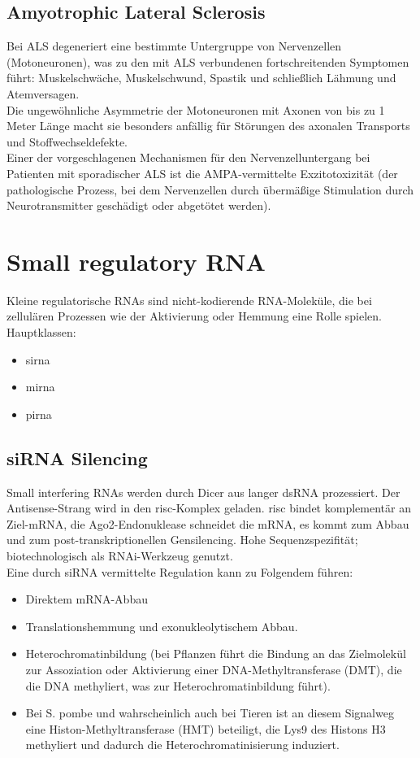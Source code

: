 \subsection{Amyotrophic Lateral Sclerosis}%
Bei ALS degeneriert eine bestimmte Untergruppe von Nervenzellen (Motoneuronen), was zu den mit ALS verbundenen fortschreitenden Symptomen führt: Muskelschwäche, Muskelschwund, Spastik und schließlich Lähmung und Atemversagen. \\
Die ungewöhnliche Asymmetrie der Motoneuronen mit Axonen von bis zu 1 Meter Länge macht sie besonders anfällig für Störungen des axonalen Transports und Stoffwechseldefekte.\\
Einer der vorgeschlagenen Mechanismen für den Nervenzelluntergang bei Patienten mit sporadischer ALS ist die AMPA-vermittelte Exzitotoxizität (der pathologische Prozess, bei dem Nervenzellen durch übermäßige Stimulation durch Neurotransmitter geschädigt oder abgetötet werden).

\section{Small regulatory RNA}
Kleine regulatorische RNAs sind nicht-kodierende RNA-Moleküle, die bei zellulären Prozessen wie der Aktivierung oder Hemmung eine Rolle spielen.  \\
Hauptklassen:
\begin{itemize}
    \item \gls{sirna}
    \item \gls{mirna}
    \item \gls{pirna}
\end{itemize}
\subsection{siRNA Silencing} %
Small interfering RNAs werden durch Dicer aus langer dsRNA prozessiert. Der Antisense-Strang wird in den \gls{risc}-Komplex geladen. \gls{risc} bindet komplementär an Ziel-mRNA, die Ago2-Endonuklease schneidet die mRNA, es kommt zum Abbau und zum post-transkriptionellen Gensilencing. Hohe Sequenzspezifität; biotechnologisch als RNAi-Werkzeug genutzt. \\
Eine durch siRNA vermittelte Regulation kann zu Folgendem führen: 
\begin{itemize}
    \item Direktem mRNA-Abbau
    \item Translationshemmung und exonukleolytischem Abbau. 
    \item Heterochromatinbildung (bei Pflanzen führt die Bindung an das Zielmolekül zur Assoziation oder Aktivierung einer DNA-Methyltransferase (DMT), die die DNA methyliert, was zur Heterochromatinbildung führt). 
    \item Bei S. pombe und wahrscheinlich auch bei Tieren ist an diesem Signalweg eine Histon-Methyltransferase (HMT) beteiligt, die Lys9 des Histons H3 methyliert und dadurch die Heterochromatinisierung induziert.
\end{itemize}
